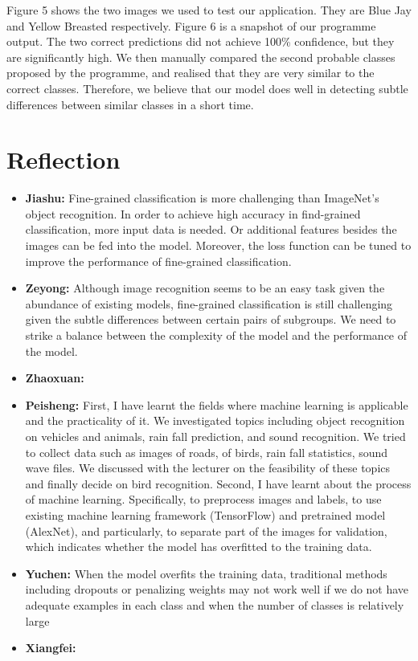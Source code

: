 \documentclass[letterpaper, 12pt]{article}
\begin{document}
Figure 5 shows the two images we used to test our application. They are Blue Jay and Yellow Breasted respectively. Figure 6 is a snapshot of our programme output.
The two correct predictions did not achieve 100\% confidence, but they are significantly high. We then manually compared the second probable classes proposed by
the programme, and realised that they are very similar to the correct classes. Therefore, we believe that our model does well in detecting subtle differences
between similar classes in a short time.

\section{Reflection}
\begin{itemize}
    \item \textbf{Jiashu:} Fine-grained classification is more challenging than ImageNet's object recognition. In order to achieve high accuracy in find-grained
    classification, more input data is needed. Or additional features besides the images can be fed into the
     model. Moreover, the loss function can be tuned to improve the performance of fine-grained
     classification.
    \item \textbf{Zeyong:} Although image recognition seems to be an easy task given the abundance of existing models, fine-grained classification is still
    challenging given the subtle differences between certain pairs of subgroups. We need to strike a balance
     between the complexity of the model and the performance of the model.
    \item \textbf{Zhaoxuan:}
    \item \textbf{Peisheng:} First, I have learnt the fields where machine learning is applicable and the
    practicality of it. We investigated topics including object recognition on vehicles and animals, rain
    fall prediction, and sound recognition. We tried to collect data such as images of roads, of birds,
    rain fall statistics, sound wave files. We discussed with the lecturer on the feasibility of these
    topics and finally decide on bird recognition.
Second, I have learnt about the process of machine learning. Specifically, to preprocess images and labels,
to use existing machine learning framework (TensorFlow) and pretrained model (AlexNet), and particularly,
to separate part of the images for validation, which indicates whether the model has overfitted to the
training data.
    \item \textbf{Yuchen:} When the model overfits the training data, traditional methods including
    dropouts or penalizing weights may not work well if we do not have adequate examples in each class and
    when the number of classes is relatively large
    \item \textbf{Xiangfei:}
\end{itemize}
\end{document}
